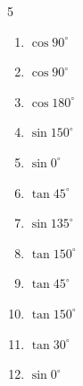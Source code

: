 \begin{multicols}{5}
\begin{enumerate}

  \item $\displaystyle \cos{90^\circ}$

        \phantom{$\displaystyle =0$}

  \item $\displaystyle \cos{90^\circ}$

        \phantom{$\displaystyle =0$}

  \item $\displaystyle \cos{180^\circ}$

        \phantom{$\displaystyle =-1$}

  \item $\displaystyle \sin{150^\circ}$


  \item $\displaystyle \sin{0^\circ}$

        \phantom{$\displaystyle =0$}

  \item $\displaystyle \tan{45^\circ}$

        \phantom{$\displaystyle =1$}

  \item $\displaystyle \sin{135^\circ}$


  \item $\displaystyle \tan{150^\circ}$


  \item $\displaystyle \tan{45^\circ}$

        \phantom{$\displaystyle =1$}

  \item $\displaystyle \tan{150^\circ}$


  \item $\displaystyle \tan{30^\circ}$


  \item $\displaystyle \sin{0^\circ}$

        \phantom{$\displaystyle =0$}

\columnbreak %


\end{enumerate}
\end{multicols}
